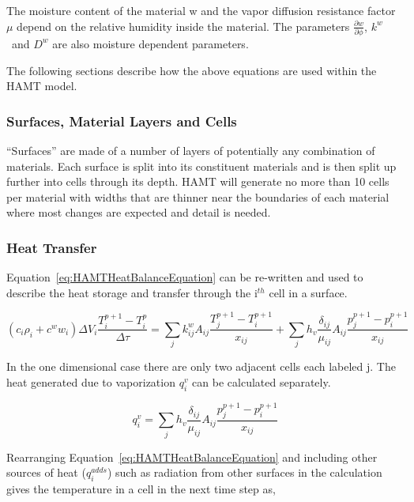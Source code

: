 The moisture content of the material w and the vapor diffusion resistance factor $\mu$ depend on the relative humidity inside the material. The parameters \(\frac{\partial w}{\partial \phi}\), \({k^w}\) ~and \({D^w}\) are also moisture dependent parameters.

The following sections describe how the above equations are used within the HAMT model.

\subsubsection{Surfaces, Material Layers and Cells}\label{surfaces-material-layers-and-cells}

``Surfaces'' are made of a number of layers of potentially any combination of materials. Each surface is split into its constituent materials and is then split up further into cells through its depth. HAMT will generate no more than 10 cells per material with widths that are thinner near the boundaries of each material where most changes are expected and detail is needed.

\subsubsection{Heat Transfer}\label{heat-transfer}

Equation~\ref{eq:HAMTHeatBalanceEquation} can be re-written and used to describe the heat storage and transfer through the i\(^{th}\) cell in a surface.

\begin{equation}
\left( {{c_i}{\rho_i} + {c^w}{w_i}} \right)\Delta {V_i}\frac{{T_i^{p + 1} - T_i^p}}{{\Delta \tau }} = \sum\limits_j {k_{ij}^w{A_{ij}}\frac{{T_j^{p + 1} - T_i^{p + 1}}}{{{x_{ij}}}}}  + \sum\limits_j {{h_v}\frac{{{\delta_{ij}}}}{{{\mu_{ij}}}}{A_{ij}}\frac{{p_j^{p + 1} - p_i^{p + 1}}}{{{x_{ij}}}}}
\end{equation}

In the one dimensional case there are only two adjacent cells each labeled j. The heat generated due to vaporization \(q_i^v\) can be calculated separately.

\begin{equation}
q_i^v = \sum\limits_j {{h_v}\frac{{{\delta_{ij}}}}{{{\mu_{ij}}}}{A_{ij}}\frac{{p_j^{p + 1} - p_i^{p + 1}}}{{{x_{ij}}}}}
\end{equation}

Rearranging Equation~\ref{eq:HAMTHeatBalanceEquation} and including other sources of heat (\(q_i^{adds}\)) such as radiation from other surfaces in the calculation gives the temperature in a cell in the next time step as,

